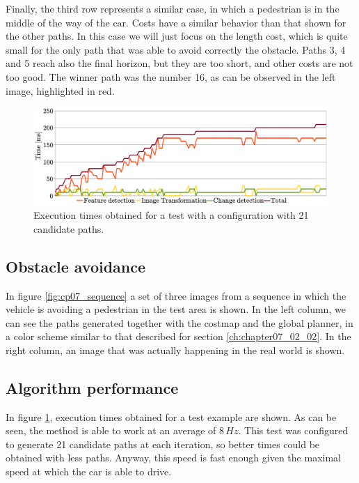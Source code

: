 Finally, the third row represents a similar case, in which a pedestrian is in the middle of the way of the car. Costs have a similar behavior than that shown for the other paths. In this case we will just focus on the length cost, which is quite small for the only path that was able to avoid correctly the obstacle. Paths 3, 4 and 5 reach also the final horizon, but they are too short, and other costs are not too good. The winner path was the number 16, as can be observed in the left image, highlighted in red.

\begin{figure}[h!]
  \centering
  \includegraphics[width=\textwidth,height=0.5\textwidth,trim=50 50 90 60, clip]{times}
  \caption{Execution times obtained for a test with a configuration with 21 candidate paths.}\label{fig:cp07_times}
\end{figure}

\subsection{Obstacle avoidance}\label{ch:chapter07_02_03}

In figure \ref{fig:cp07_sequence} a set of three images from a sequence in which the vehicle is avoiding a pedestrian in the test area is shown. In the left column, we can see the paths generated together with the costmap and the global planner, in a color scheme similar to that described for section \ref{ch:chapter07_02_02}. In the right column, an image that was actually happening in the real world is shown.

\subsection{Algorithm performance}\label{ch:chapter07_02_04}

In figure \ref{fig:cp07_times}, execution times obtained for a test example are shown. As can be seen, the method is able to work at an average of $8\,Hz$. This test was configured to generate 21 candidate paths at each iteration, so better times could be obtained with less paths. Anyway, this speed is fast enough given the maximal speed at which the car is able to drive.

